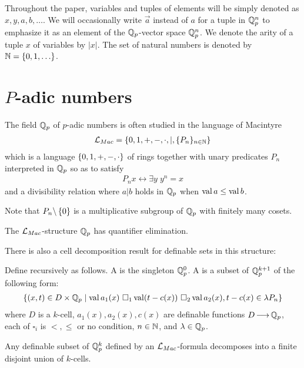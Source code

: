 \documentclass{amsart}
\begin{document}
Throughout the paper, variables and tuples of elements will be simply denoted as $x, y, a, b, \ldots$.
We will occasionally write $\vec a$ instead of $a$ for a tuple in $\mathbb{Q}_p^n$ to emphasize it as an element of the $\mathbb{Q}_p$-vector space $\mathbb{Q}_p^n$.
We denote the arity of a tuple $x$ of variables by $|x|$.
The set of natural numbers is denoted by $\mathbb{N} = \left\{0, 1, \ldots\right\}$.





\section{$P$-adic numbers}
The field $\mathbb{Q}_p$ of $p$-adic numbers is often studied in the language of Macintyre 
  \begin{align*}
	\mathcal L_{Mac} = \left\{0, 1, +, -, \cdot, |, \{P_n\}_{n \in \mathbb{N}}\right\}
  \end{align*}
which is a language $\left\{0, 1, +, -, \cdot\right\}$ of rings together with unary predicates $P_n$ interpreted in $\mathbb{Q}_p$ so as to satisfy
\begin{align*}
  P_n x \leftrightarrow \exists y \; y^n = x
\end{align*}
and a divisibility relation where $a|b$ holds in $\mathbb{Q}_p$ when $\operatorname{val} a \leq \operatorname{val} b$.

Note that $P_n\backslash \left\{0\right\}$ is a multiplicative subgroup of $\mathbb{Q}_p$ with finitely many cosets.
\begin{Theorem} 
  The $\mathcal L_{Mac}$-structure $\mathbb{Q}_p$ has quantifier elimination.
\end{Theorem}

There is also a cell decomposition result for definable sets in this structure:
\begin{Definition}
  Define  recursively as follows.
  A  is the singleton $\mathbb{Q}_p^0$.
  A  is a subset of $\mathbb{Q}_p^{k+1}$ of the following form:
  \begin{align*}
    \left\{(x, t) \in D \times \mathbb{Q}_p \mid \operatorname{val} a_1(x) \ \square_1 \operatorname{val} (t - c(x)) \ \square_2 \operatorname{val} a_2(x), t - c(x) \in \lambda P_n\right\}
  \end{align*}
  where $D$ is a $k$-cell,
  $a_1(x), a_2(x), c(x)$ are definable functions $D \operatorname{\longrightarrow} \mathbb{Q}_p$,
  each of $\square_i$ is $<, \leq$ or no condition,
  $n \in \mathbb{N}$,
  and
  $\lambda \in \mathbb{Q}_p$.    
\end{Definition}

\begin{Theorem} 
  Any definable subset of $\mathbb{Q}_p^k$ defined by an $\mathcal L_{Mac}$-formula decomposes into a finite disjoint union of $k$-cells.
\end{Theorem}  
\end{document}
